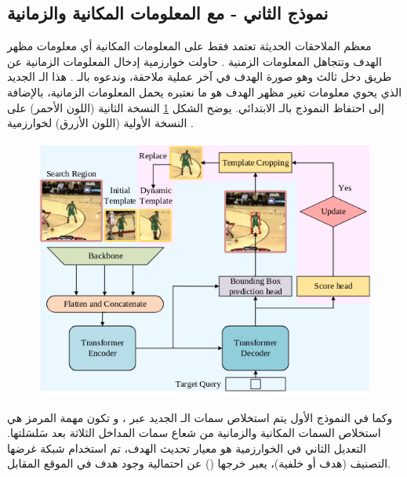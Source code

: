 \subsection{نموذج 
الثاني - مع المعلومات المكانية والزمانية}
معظم الملاحقات الحديثة تعتمد فقط على المعلومات المكانية أي معلومات مظهر الهدف وتتجاهل المعلومات الزمنية
.
حاولت خوارزمية
إدخال المعلومات الزمانية عن طريق دخل ثالث وهو صورة الهدف في آخر عملية ملاحقة، وندعوه بالـ 
.
هذا الـ
 الجديد الذي يحوي معلومات تغير مظهر الهدف هو ما نعتبره يحمل المعلومات الزمانية، بالإضافة إلى احتفاظ النموذج بالـ
الابتدائي.
\newline
يوضح الشكل 
\ref{stark-full}
النسخة الثانية 
(اللون الأحمر) على النسخة الأولية (اللون الأزرق) لخوارزمية 
.
\begin{figure}[!h]
	\centerline{\includegraphics[width=\textwidth]{images/stark_full}}
	\caption{
		}
\label{stark-full}
\end{figure}
وكما في النموذج الأول يتم استخلاص سمات الـ
الجديد عبر
،
و تكون مهمة المرمز هي استخلاص السمات المكانية والزمانية من شعاع سمات
 المداخل الثلاثة بعد سَلسَلتها.
\newline
التعديل الثاني في الخوارزمية هو معيار تحديث الهدف،
تم استخدام شبكة
 غرضها التصنيف (هدف أو خلفية)،
يعبر خرجها
()
 عن احتمالية وجود هدف في الموقع المقابل.

